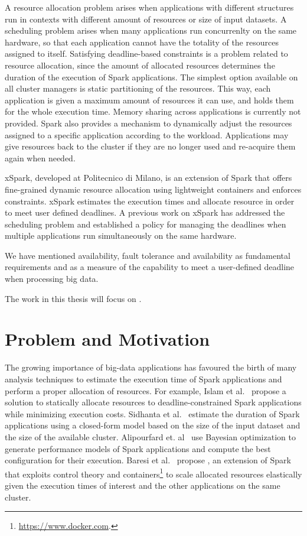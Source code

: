 A resource allocation problem arises when applications with different structures run in contexts with different amount of resources or size of input datasets. A scheduling problem arises when many applications run concurrenlty on the same hardware, so that each application cannot have the totality of the resources assigned to itself. Satisfying deadline-based \qos constraints is a problem related to resource allocation, since the amount of allocated resources determines the duration of the execution of Spark applications. The simplest option available on all cluster managers is static partitioning of the resources. This way, each application is given a maximum amount of resources it can use, and holds them for the whole execution time. Memory sharing across applications is currently not provided. Spark also provides a mechanism to dynamically adjust the resources assigned to a specific application according to the workload. Applications may give resources back to the cluster if they are no longer used and re-acquire them again when needed.

xSpark, developed at Politecnico di Milano, is an extension of Spark that offers fine-grained dynamic resource allocation using lightweight containers and enforces \qos constraints. xSpark estimates the execution times and allocate resource in order to meet user defined deadlines. A previous work on xSpark has addressed the scheduling problem and established a policy for managing the deadlines when multiple applications run simultaneously on the same hardware.

We have mentioned availability, fault tolerance and availability as fundamental requirements and \qos as a measure of the capability to meet a user-defined deadline when processing big data. 

The work in this thesis will focus on \qos.

\section{Problem and Motivation}\label{sec:problem_motivation}
The growing importance of big-data applications has favoured the birth of many analysis techniques to estimate the execution time of Spark applications and perform a proper allocation of resources. For example, Islam et al.~\cite{dSpark} propose a solution to statically allocate resources to deadline-constrained Spark applications while minimizing execution costs. Sidhanta et al.~\cite{Sidhanta2016} estimate the duration of Spark applications using a closed-form model based on the size of the input dataset and the size of the available cluster. Alipourfard et. al~\cite{Alipourfard} use Bayesian optimization to generate performance models of Spark applications and compute the best configuration for their execution.  Baresi et al.~\cite{xsparkreport, Quattrocchi2018} propose \cSpark, an extension of Spark that exploits control theory and containers\footnote{\url{https://www.docker.com}.} to scale allocated resources elastically given the execution times of interest and the other applications  on the same cluster.

